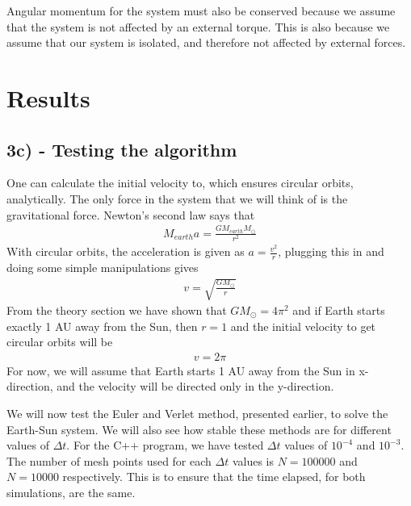 \documentclass[12pt]{article}
\begin{document}
Angular momentum for the system must also be conserved because we assume that the system is not affected by an external torque. This is also because we assume that our system is isolated, and therefore not affected by external forces.
\section*{Results}

\subsection*{3c) - Testing the algorithm}


One can calculate the initial velocity to, which ensures circular orbits, analytically. The only force in the system that we will think of is the gravitational force. Newton's second law says that
\begin{align*}
M_{earth}a = \frac{GM_{earth}M_{\odot}}{r^2}
\end{align*}
With circular orbits, the acceleration is given as $a = \frac{v^2}{r}$, plugging this in and doing some simple manipulations gives
\begin{align*}
v = \sqrt{\frac{GM_{\odot}}{r}}
\end{align*}
From the theory section we have shown that $GM_{\odot} = 4\pi^2$ and if Earth starts exactly 1 AU away from the Sun, then $r = 1$ and the initial velocity to get circular orbits will be
\begin{align*}
v = 2\pi
\end{align*}
For now, we will assume that Earth starts 1 AU away from the Sun in x-direction, and the velocity will be directed only in the y-direction.

We will now test the Euler and Verlet method, presented earlier, to solve the Earth-Sun system. We will also see how stable these methods are for different values of $\Delta t$. For the C++ program, we have tested $\Delta t$ values of $10^{-4}$ and $10^{-3}$. The number of mesh points used for each $\Delta t$ values is $N = 100 000$ and $N=10 000$ respectively. This is to ensure that the time elapsed, for both simulations, are the same.
\end{document}
